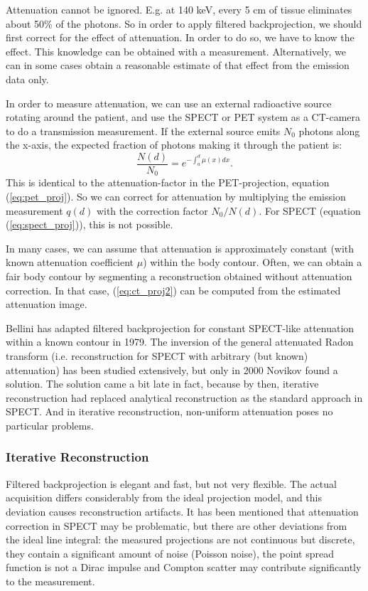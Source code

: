 \documentclass[11pt,oneside]{article}
\begin{document}
Attenuation cannot be ignored. E.g. at 140 keV, every 5 cm of tissue eliminates
about 50\% of the photons. So in order to apply filtered backprojection, we
should first correct for the effect of attenuation. In order to do so, we have
to know the effect. This knowledge can be obtained with a measurement.
Alternatively, we can in some cases obtain a reasonable estimate of that effect
from the emission data only.

In order to measure attenuation, we can use an external radioactive source
rotating around the patient, and use the SPECT or PET system as a CT-camera to
do a transmission measurement. If the external source emits $N_0$ photons
along the x-axis, the expected fraction of photons making it through the
patient is:
\begin{equation}
\frac{N(d)}{N_0} = e^{-\int_a^d \mu(x) dx} \label{eq:ct_proj2}.
\end{equation}
This is identical to the attenuation-factor in the PET-projection, equation
(\ref{eq:pet_proj}). So we can correct for attenuation by multiplying the
emission measurement $q(d)$ with the correction factor $N_0 / N(d)$.
For SPECT (equation (\ref{eq:spect_proj})), this is not possible.

In many cases, we can assume that attenuation is approximately constant (with
known attenuation coefficient $\mu$) within the body contour. Often, we can
obtain a fair body contour by segmenting a reconstruction obtained without
attenuation correction. In that case, (\ref{eq:ct_proj2}) can be computed from
the estimated attenuation image.

Bellini has adapted filtered backprojection for constant SPECT-like attenuation
within a known contour in 1979. The inversion of the general attenuated Radon
transform (i.e. reconstruction for SPECT with arbitrary (but known) attenuation) has
been studied extensively, but only in 2000 Novikov found a solution. The solution
came a bit late in fact, because by then, iterative reconstruction had replaced
analytical reconstruction as the standard approach in SPECT. And in iterative
reconstruction, non-uniform attenuation poses no particular problems.

\subsubsection{Iterative Reconstruction} \label{sec:iterrecon}
Filtered backprojection is elegant and fast, but not very
flexible. The actual acquisition differs considerably from the ideal
projection model, and this deviation causes reconstruction
artifacts. It has been mentioned that attenuation correction in SPECT
may be problematic, but there are other deviations from the ideal line
integral: the measured projections are not continuous but discrete,
they contain a significant amount of noise (Poisson noise), the point
spread function is not a Dirac impulse and Compton scatter may
contribute significantly to the measurement.
\end{document}

